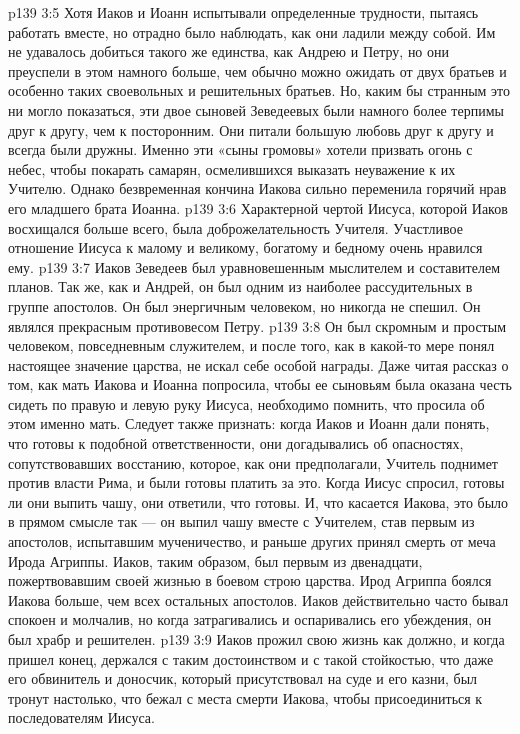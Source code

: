 \vs p139 3:5 Хотя Иаков и Иоанн испытывали определенные трудности, пытаясь работать вместе, но отрадно было наблюдать, как они ладили между собой. Им не удавалось добиться такого же единства, как Андрею и Петру, но они преуспели в этом намного больше, чем обычно можно ожидать от двух братьев и особенно таких своевольных и решительных братьев. Но, каким бы странным это ни могло показаться, эти двое сыновей Зеведеевых были намного более терпимы друг к другу, чем к посторонним. Они питали большую любовь друг к другу и всегда были дружны. Именно эти «сыны громовы» хотели призвать огонь с небес, чтобы покарать самарян, осмелившихся выказать неуважение к их Учителю. Однако безвременная кончина Иакова сильно переменила горячий нрав его младшего брата Иоанна.
\vs p139 3:6 \pc Характерной чертой Иисуса, которой Иаков восхищался больше всего, была доброжелательность Учителя. Участливое отношение Иисуса к малому и великому, богатому и бедному очень нравился ему.
\vs p139 3:7 \pc Иаков Зеведеев был уравновешенным мыслителем и составителем планов. Так же, как и Андрей, он был одним из наиболее рассудительных в группе апостолов. Он был энергичным человеком, но никогда не спешил. Он являлся прекрасным противовесом Петру.
\vs p139 3:8 Он был скромным и простым человеком, повседневным служителем, и после того, как в какой\hyp{}то мере понял настоящее значение царства, не искал себе особой награды. Даже читая рассказ о том, как мать Иакова и Иоанна попросила, чтобы ее сыновьям была оказана честь сидеть по правую и левую руку Иисуса, необходимо помнить, что просила об этом именно мать. Следует также признать: когда Иаков и Иоанн дали понять, что готовы к подобной ответственности, они догадывались об опасностях, сопутствовавших восстанию, которое, как они предполагали, Учитель поднимет против власти Рима, и были готовы платить за это. Когда Иисус спросил, готовы ли они выпить чашу, они ответили, что готовы. И, что касается Иакова, это было в прямом смысле так --- он выпил чашу вместе с Учителем, став первым из апостолов, испытавшим мученичество, и раньше других принял смерть от меча Ирода Агриппы. Иаков, таким образом, был первым из двенадцати, пожертвовавшим своей жизнью в боевом строю царства. Ирод Агриппа боялся Иакова больше, чем всех остальных апостолов. Иаков действительно часто бывал спокоен и молчалив, но когда затрагивались и оспаривались его убеждения, он был храбр и решителен.
\vs p139 3:9 \pc Иаков прожил свою жизнь как должно, и когда пришел конец, держался с таким достоинством и с такой стойкостью, что даже его обвинитель и доносчик, который присутствовал на суде и его казни, был тронут настолько, что бежал с места смерти Иакова, чтобы присоединиться к последователям Иисуса.
